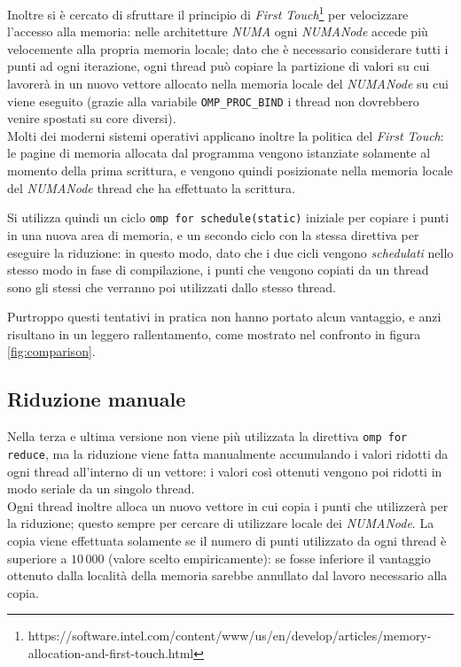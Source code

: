 Inoltre si è cercato di sfruttare il principio di \emph{First Touch}\footnote{https://software.intel.com/content/www/us/en/develop/articles/memory-allocation-and-first-touch.html} per velocizzare l'accesso alla memoria:
nelle architetture \emph{NUMA} ogni \emph{NUMANode} accede più velocemente alla propria memoria locale;
dato che è necessario considerare tutti i punti ad ogni iterazione, ogni thread può copiare la partizione di valori su cui lavorerà in un nuovo vettore
allocato nella memoria locale del \emph{NUMANode} su cui viene eseguito
(grazie alla variabile \texttt{OMP\_PROC\_BIND} i thread non dovrebbero venire spostati su core diversi).\\
Molti dei moderni sistemi operativi applicano inoltre la politica del \emph{First Touch}: le pagine di memoria allocata dal programma vengono istanziate solamente al momento della prima
scrittura, e vengono quindi posizionate nella memoria locale del \emph{NUMANode} thread che ha effettuato la scrittura.

Si utilizza quindi un ciclo \texttt{omp for schedule(static)} iniziale per copiare i punti in una nuova area di memoria, e un secondo ciclo con la stessa direttiva per eseguire la riduzione: in questo modo, dato che i due cicli vengono \emph{schedulati} nello stesso modo in fase di compilazione, i punti che vengono copiati da un thread sono gli stessi che verranno poi utilizzati dallo stesso thread.

Purtroppo questi tentativi in pratica non hanno portato alcun vantaggio, e anzi risultano in un leggero rallentamento, come mostrato nel confronto in figura \ref{fig:comparison}.

\subsection{Riduzione manuale}
Nella terza e ultima versione non viene più utilizzata la direttiva \texttt{omp for reduce}, ma la riduzione viene fatta manualmente accumulando i valori
ridotti da ogni thread all'interno di un vettore: i valori così ottenuti vengono poi ridotti in modo seriale da un singolo thread.\\
Ogni thread inoltre alloca un nuovo vettore in cui copia i punti che utilizzerà per la riduzione; questo sempre per cercare di utilizzare locale dei \emph{NUMANode}.
La copia viene effettuata solamente se il numero di punti utilizzato da ogni thread è superiore a $10\,000$ (valore scelto empiricamente):
se fosse inferiore il vantaggio ottenuto dalla località della memoria sarebbe annullato dal lavoro necessario alla copia.

